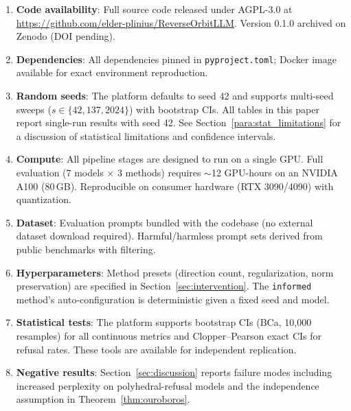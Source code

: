 \begin{enumerate}[leftmargin=*]
\item \textbf{Code availability}: Full source code released under AGPL-3.0 at \url{https://github.com/elder-plinius/ReverseOrbitLLM}. Version 0.1.0 archived on Zenodo (DOI pending).
\item \textbf{Dependencies}: All dependencies pinned in \texttt{pyproject.toml}; Docker image available for exact environment reproduction.
\item \textbf{Random seeds}: The platform defaults to seed 42 and supports multi-seed sweeps ($s \in \{42, 137, 2024\}$) with bootstrap CIs. All tables in this paper report single-run results with seed 42. See Section~\ref{para:stat_limitations} for a discussion of statistical limitations and confidence intervals.
\item \textbf{Compute}: All pipeline stages are designed to run on a single GPU. Full evaluation (7 models $\times$ 3 methods) requires ${\sim}$12 GPU-hours on an NVIDIA A100 (80\,GB). Reproducible on consumer hardware (RTX 3090/4090) with quantization.
\item \textbf{Dataset}: Evaluation prompts bundled with the codebase (no external dataset download required). Harmful/harmless prompt sets derived from public benchmarks with filtering.
\item \textbf{Hyperparameters}: Method presets (direction count, regularization, norm preservation) are specified in Section~\ref{sec:intervention}. The \texttt{informed} method's auto-configuration is deterministic given a fixed seed and model.
\item \textbf{Statistical tests}: The platform supports bootstrap CIs (BCa, 10{,}000 resamples) for all continuous metrics and Clopper--Pearson exact CIs for refusal rates. These tools are available for independent replication.
\item \textbf{Negative results}: Section~\ref{sec:discussion} reports failure modes including increased perplexity on polyhedral-refusal models and the independence assumption in Theorem~\ref{thm:ouroboros}.
\end{enumerate}
